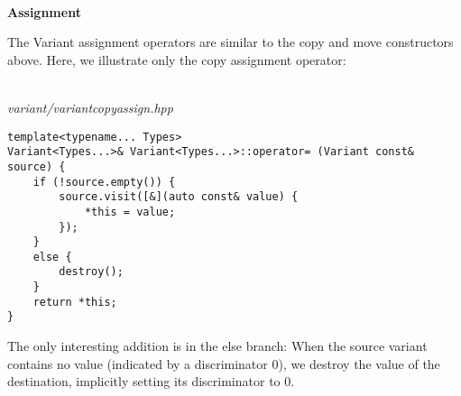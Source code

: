 \hspace*{\fill} \\ %
\noindent
\textbf{Assignment}

The Variant assignment operators are similar to the copy and move constructors above. Here, we illustrate only the copy assignment operator:

\hspace*{\fill} \\ %
\noindent
\textit{variant/variantcopyassign.hpp}
\begin{lstlisting}[style=styleCXX]
template<typename... Types>
Variant<Types...>& Variant<Types...>::operator= (Variant const& source) {
	if (!source.empty()) {
		source.visit([&](auto const& value) {
			*this = value;
		});
	}
	else {
		destroy();
	}
	return *this;
}
\end{lstlisting}

The only interesting addition is in the else branch: When the source variant contains no value (indicated by a discriminator 0), we destroy the value of the destination, implicitly setting its discriminator to 0.


















